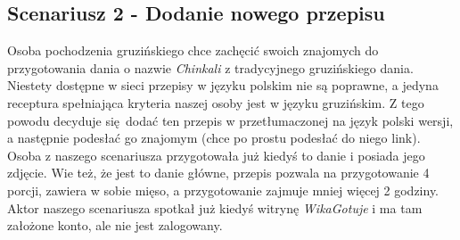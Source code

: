 \documentclass{article}
\begin{document}
\subsection{Scenariusz 2 - Dodanie nowego przepisu}
Osoba pochodzenia gruzińskiego chce zachęcić swoich znajomych do przygotowania dania o nazwie \textit{Chinkali} z tradycyjnego gruzińskiego dania. Niestety dostępne w sieci przepisy
w języku polskim nie są poprawne, a jedyna receptura spełniająca kryteria naszej osoby jest w języku gruzińskim. Z tego powodu decyduje się dodać ten przepis w przetłumaczonej
na język polski wersji, a następnie podesłać go znajomym (chce po prostu podesłać do niego link). Osoba z naszego scenariusza przygotowała już kiedyś to danie i posiada jego zdjęcie.
Wie też, że jest to danie główne, przepis pozwala na przygotowanie 4 porcji, zawiera w sobie mięso, a przygotowanie zajmuje mniej więcej 2 godziny. Aktor naszego scenariusza spotkał
już kiedyś witrynę \textit{WikaGotuje} i ma tam założone konto, ale nie jest zalogowany.
\end{document}

